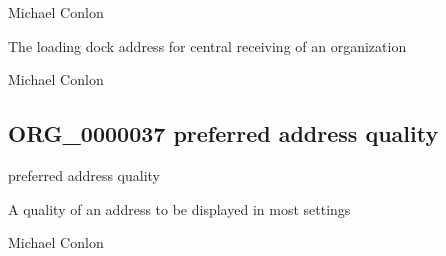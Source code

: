 \documentclass[letterpaper,10pt,english]{sphinxmanual}
\begin{document}
\begin{sphinxShadowBox}

\sphinxAtStartPar
Michael Conlon 
\end{sphinxShadowBox}

\begin{sphinxShadowBox}

\sphinxAtStartPar
The loading dock address for central receiving of an organization
\end{sphinxShadowBox}

\begin{sphinxShadowBox}

\sphinxAtStartPar
Michael Conlon 
\end{sphinxShadowBox}
\begin{quote}

\ignorespaces \end{quote}


\subsection{ORG\_0000037 \sphinxhyphen{} preferred address quality}
\label{\detokenize{doc-ORG_0000037:org-0000037-preferred-address-quality}}\label{\detokenize{doc-ORG_0000037:index-0}}\label{\detokenize{doc-ORG_0000037::doc}}
\begin{sphinxShadowBox}

\sphinxAtStartPar
preferred address quality
\end{sphinxShadowBox}

\begin{sphinxShadowBox}

\sphinxAtStartPar
A quality of an address to be displayed in most settings
\end{sphinxShadowBox}

\begin{sphinxShadowBox}

\sphinxAtStartPar
Michael Conlon 
\end{sphinxShadowBox}
\end{document}
